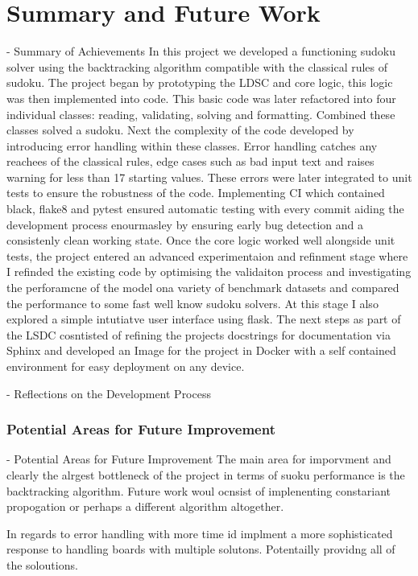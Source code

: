 \documentclass{report}
\begin{document}
\section{Summary and Future Work}
- Summary of Achievements
In this project we developed a functioning sudoku solver using the backtracking algorithm compatible with the classical rules of sudoku. The project began by prototyping the LDSC and core logic, this logic was then implemented into code. This basic code was later refactored into four individual classes: reading, validating, solving and formatting. Combined these classes solved a sudoku. Next the complexity of the code developed by introducing error handling within these classes. Error handling catches any reachees of the classical rules, edge cases such as bad input text and raises warning for less than 17 starting values. These errors were later integrated to unit tests to ensure the robustness of the code. Implementing CI which contained black, flake8 and pytest ensured automatic testing with every commit aiding the development process enourmasley by ensuring early bug detection and a consistenly clean working state. Once the core logic worked well alongside unit tests, the project entered an advanced experimentaion and refinment stage where I refinded the existing code by optimising the validaiton process and investigating the perforamcne of the model ona variety of benchmark datasets and compared the performance to some fast well know sudoku solvers. At this stage I also explored a simple intutiatve user interface using flask. The next steps as part of the LSDC cosntisted of refining the projects docstrings for documentation via Sphinx and developed an Image for the project in Docker with a self contained environment for easy deployment on any device.

- Reflections on the Development Process

\subsubsection*{Potential Areas for Future Improvement}
- Potential Areas for Future Improvement
The main area for imporvment and clearly the alrgest bottleneck of the project in terms of suoku performance is the backtracking algorithm. Future work woul ocnsist of implenenting constariant propogation or perhaps a different algorithm altogether.

In regards to error handling with more time id implment a more sophisticated response to handling boards with multiple solutons. Potentailly providng all of the soloutions.
\end{document}
